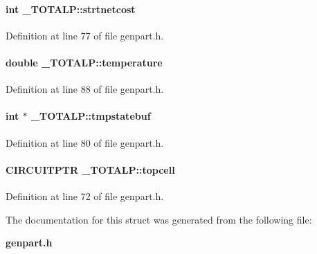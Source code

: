 \paragraph{\setlength{\rightskip}{0pt plus 5cm}int \_\-TOTALP::strtnetcost}\hfill



Definition at line 77 of file genpart.h.\label{_TOTALP_m19}
\paragraph{\setlength{\rightskip}{0pt plus 5cm}double \_\-TOTALP::temperature}\hfill



Definition at line 88 of file genpart.h.\label{_TOTALP_m11}
\paragraph{\setlength{\rightskip}{0pt plus 5cm}int $\ast$ \_\-TOTALP::tmpstatebuf}\hfill



Definition at line 80 of file genpart.h.\label{_TOTALP_m4}
\paragraph{\setlength{\rightskip}{0pt plus 5cm}CIRCUITPTR \_\-TOTALP::topcell}\hfill



Definition at line 72 of file genpart.h.

The documentation for this struct was generated from the following file:\begin{CompactItemize}
\item 
{\bf genpart.h}\end{CompactItemize}
